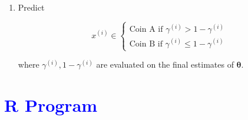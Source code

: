 \documentclass[11pt, a4paper]{article}\usepackage[]{graphicx}\usepackage[]{xcolor}
\newcommand{\bs}[1]{\boldsymbol{#1}}
\begin{document}
\begin{enumerate}
\begin{itemize}
$\left. \right\}$.
\end{itemize}

\item[\scalebox{2.0}{\twemoji{keycap: 3}}] \hspace{0.2cm} Predict 

$$x^{(i)} \in 
\begin{cases} \text{Coin A if } \gamma^{(i)} > 1 - \gamma^{(i)} \\[0.5em]
              \text{Coin B if } \gamma^{(i)} \leq 1 - \gamma^{(i)}
\end{cases}$$

where $\gamma^{(i)}, 1 - \gamma^{(i)}$ are evaluated on the final estimates of $\bs{\theta}$.

\end{enumerate}

\section*{\faArrowAltCircleRight[regular] \textcolor{blue}{R Program}}
\end{document}
